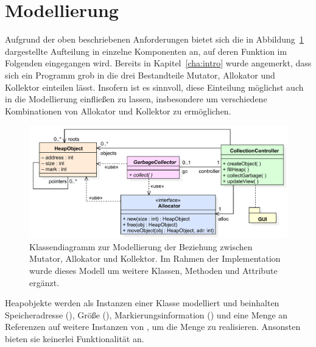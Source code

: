 \section{Modellierung}
\label{sec:model}
Aufgrund der oben beschriebenen Anforderungen bietet sich die in Abbildung~\ref{fig:model} dargestellte Aufteilung in einzelne Komponenten an, auf deren Funktion im Folgenden eingegangen wird.
Bereits in Kapitel~\ref{cha:intro} wurde angemerkt, dass sich ein Programm grob in die drei Bestandteile Mutator, Allokator und Kollektor einteilen lässt.
Insofern ist es sinnvoll, diese Einteilung möglichst auch in die Modellierung einfließen zu lassen, insbesondere um verschiedene Kombinationen von Allokator und Kollektor zu ermöglichen.

\begin{figure}[h]
	\centering
	\includegraphics[scale=0.6]{img/uml/ch7-model.pdf}
	\caption[Klassendiagramm zur Modellierung von Mutator, Allokator und Kollektor]{Klassendiagramm zur Modellierung der Beziehung zwischen Mutator, Allokator und Kollektor. Im Rahmen der Implementation wurde dieses Modell um weitere Klassen, Methoden und Attribute ergänzt.}
	\label{fig:model}
\end{figure}

Heapobjekte werden als Instanzen einer Klasse  modelliert und beinhalten Speicheradresse (), Größe (), Markierungsinformation () und eine Menge  an Referenzen auf weitere Instanzen von , um die Menge \Pointers zu realisieren.
Ansonsten bieten sie keinerlei Funktionalität an.

